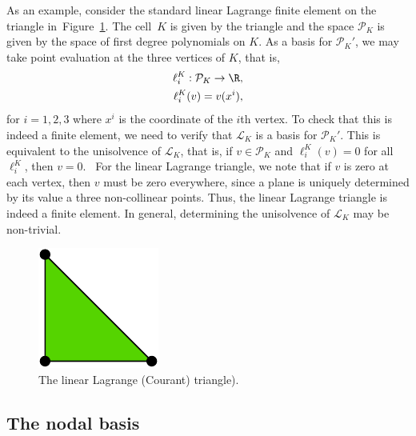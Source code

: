 As an example, consider the standard linear Lagrange finite element on
the triangle in~Figure~\ref{fig:P1}. The cell~$K$ is given by the
triangle and the space $\mathcal{P}_K$ is given by the space of first
degree polynomials on $K$. As a basis for $\mathcal{P}_K'$, we may
take point evaluation at the three vertices of $K$, that is,
\begin{displaymath}
  \begin{split}
    \ell^K_i : \mathcal{P}_K \rightarrow \R, \\
    \ell^K_i(v) = v(x^i),
  \end{split}
\end{displaymath}
for $i=1,2,3$ where $x^i$ is the coordinate of the $i$th vertex. To
check that this is indeed a finite element, we need to verify that
$\mathcal{L}_K$ is a basis for $\mathcal{P}_K'$. This is equivalent to
the unisolvence of $\mathcal{L}_K$, that is, if $v\in\mathcal{P}_K$
and $\ell^K_i(v) = 0$ for all $\ell^K_i$, then $v =
0$.~\cite{BrennerScott2008} For the linear Lagrange triangle, we note
that if $v$ is zero at each vertex, then $v$ must be zero everywhere,
since a plane is uniquely determined by its value a three
non-collinear points. Thus, the linear Lagrange triangle is indeed a
finite element.  In general, determining the unisolvence of
$\mathcal{L}_K$ may be non-trivial.

\begin{figure}
  \begin{center}
    \includegraphics[width=\smallfig]{chapters/kirby-7/pdf/P1.pdf}
    \caption{The linear Lagrange (Courant) triangle).}
    \label{fig:P1}
  \end{center}
\end{figure}

\subsection{The nodal basis}

